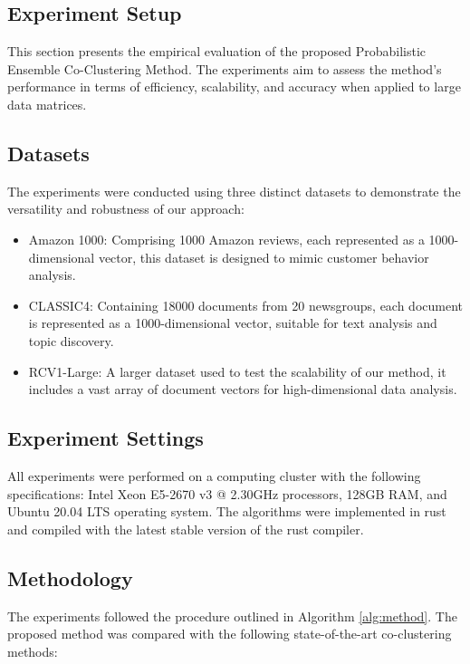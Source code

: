 \subsection{Experiment Setup}

This section presents the empirical evaluation of the proposed Probabilistic Ensemble Co-Clustering Method. The experiments aim to assess the method's performance in terms of efficiency, scalability, and accuracy when applied to large data matrices.

\subsection{Datasets}

The experiments were conducted using three distinct datasets to demonstrate the versatility and robustness of our approach:

\begin{itemize}
    \item Amazon 1000: Comprising 1000 Amazon reviews, each represented as a 1000-dimensional vector, this dataset is designed to mimic customer behavior analysis.
    \item CLASSIC4: Containing 18000 documents from 20 newsgroups, each document is represented as a 1000-dimensional vector, suitable for text analysis and topic discovery.
    \item RCV1-Large: A larger dataset used to test the scalability of our method, it includes a vast array of document vectors for high-dimensional data analysis.
\end{itemize}

\subsection{Experiment Settings}
All experiments were performed on a computing cluster with the following specifications: Intel Xeon E5-2670 v3 @ 2.30GHz processors, 128GB RAM, and Ubuntu 20.04 LTS operating system. The algorithms were implemented in rust and compiled with the latest stable version of the rust compiler. 

\subsection{Methodology}
The experiments followed the procedure outlined in Algorithm \ref{alg:method}. The proposed method was compared with the following state-of-the-art co-clustering methods:

